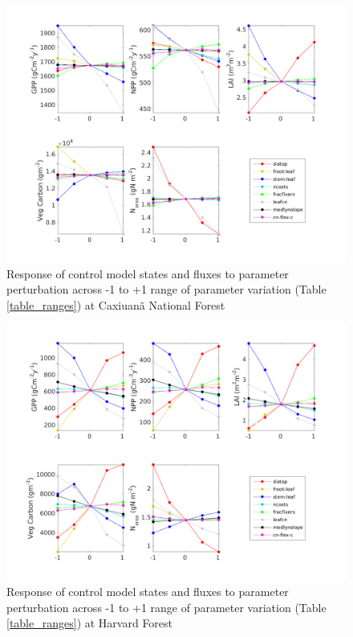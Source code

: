\usepackage{}\documentclass[draft,linenumbers]{agujournal}
\begin{document}
 \begin{figure}[h]
     \includegraphics[width=1.2\textwidth]{matlab/figures/MAY19jp_STATE_-r200_CAX_y2000.png}
     \caption{Response of control model states and fluxes to parameter perturbation across -1 to +1 range of parameter variation (Table \ref{table_ranges}) at Caxiuan\~a National Forest}
     \label{CAX state}
  \end{figure}
 
 \begin{figure}[h]
     \includegraphics[width=1.2\textwidth]{matlab/figures/MAY19jp_STATE_-r200_HVF_y2000.png}
     \caption{Response of control model states and fluxes to parameter perturbation across -1 to +1 range of parameter variation (Table \ref{table_ranges}) at Harvard Forest}
     \label{HVF state}
 \end{figure}
 
\end{document}
